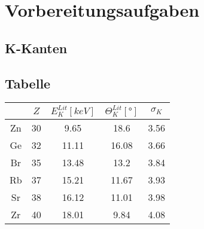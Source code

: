 \section{Vorbereitungsaufgaben}
\label{sec:Vorbereitungsaufgaben}

\subsection{K-Kanten}


\subsection{Tabelle}
\begin{table}
    \centering
    \begin{tabular}{|c|c|c|c|c|}
        \toprule
        {} & {$Z$} & {$E_{K}^{Lit}\left[\unit{keV}\right]$\cite{energie_k}} & {$\Theta_{K}^{Lit}\left[\unit{°}\right]$} & {$\sigma_{K}$}\\
        \midrule
        Zn & 30 & 9.65 & 18.6 & 3.56 \\
        Ge & 32 & 11.11 & 16.08 & 3.66 \\
        Br & 35 & 13.48 & 13.2 & 3.84 \\
        Rb & 37 & 15.21 & 11.67 & 3.93 \\
        Sr & 38 & 16.12 & 11.01 & 3.98 \\
        Zr & 40 & 18.01 & 9.84 & 4.08 \\
        \bottomrule
    \end{tabular}
\end{table}